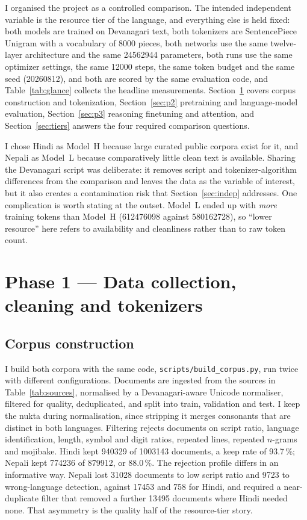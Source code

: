 \documentclass[10pt,a4paper]{article}
\newcommand{\pc}[1]{#1\,\%}
\begin{document}
I organised the project as a controlled comparison. The intended independent
variable is the resource tier of the language, and everything else is held fixed:
both models are trained on Devanagari text, both tokenizers are SentencePiece
Unigram with a vocabulary of \num{8000} pieces, both networks use the same
twelve-layer architecture and the same \num{24562944} parameters, both runs use
the same optimizer settings, the same \num{12000} steps, the same token budget
and the same seed (\num{20260812}), and both are scored by the same evaluation
code, and Table~\ref{tab:glance} collects the headline measurements.
Section~\ref{sec:p1} covers corpus construction and tokenization,
Section~\ref{sec:p2} pretraining and language-model evaluation,
Section~\ref{sec:p3} reasoning finetuning and attention, and
Section~\ref{sec:tiers} answers the four required comparison questions.

I chose Hindi as Model~H because large curated public corpora exist for it, and
Nepali as Model~L because comparatively little clean text is available. Sharing
the Devanagari script was deliberate: it removes script and
tokenizer-algorithm differences from the comparison and leaves the data as the
variable of interest, but it also creates a contamination risk that
Section~\ref{sec:indep} addresses. One complication is worth stating at the outset. Model~L ended up with \emph{more} training tokens than Model~H
(\num{612476098} against \num{580162728}), so ``lower resource'' here refers to
availability and cleanliness rather than to raw token count.

\section{Phase 1 --- Data collection, cleaning and tokenizers}\label{sec:p1}

\subsection{Corpus construction}

I build both corpora with the same code, \texttt{scripts/build\_corpus.py}, run
twice with different configurations. Documents are ingested from the sources in
Table~\ref{tab:sources}, normalised by a Devanagari-aware Unicode normaliser,
filtered for quality, deduplicated, and split into train, validation and test.
I keep the nukta during normalisation, since stripping it merges consonants that
are distinct in both languages. Filtering rejects documents on
script ratio, language identification, length, symbol and digit ratios, repeated
lines, repeated $n$-grams and mojibake. Hindi kept \num{940329} of
\num{1003143} documents, a keep rate of \pc{93.7}; Nepali kept \num{774236} of
\num{879912}, or \pc{88.0}. The rejection profile differs in an informative way.
Nepali lost \num{31028} documents to low script ratio and \num{9723} to
wrong-language detection, against \num{17453} and \num{758} for Hindi, and
required a near-duplicate filter that removed a further \num{13495} documents
where Hindi needed none. That asymmetry is the quality half of the resource-tier
story.
\end{document}
